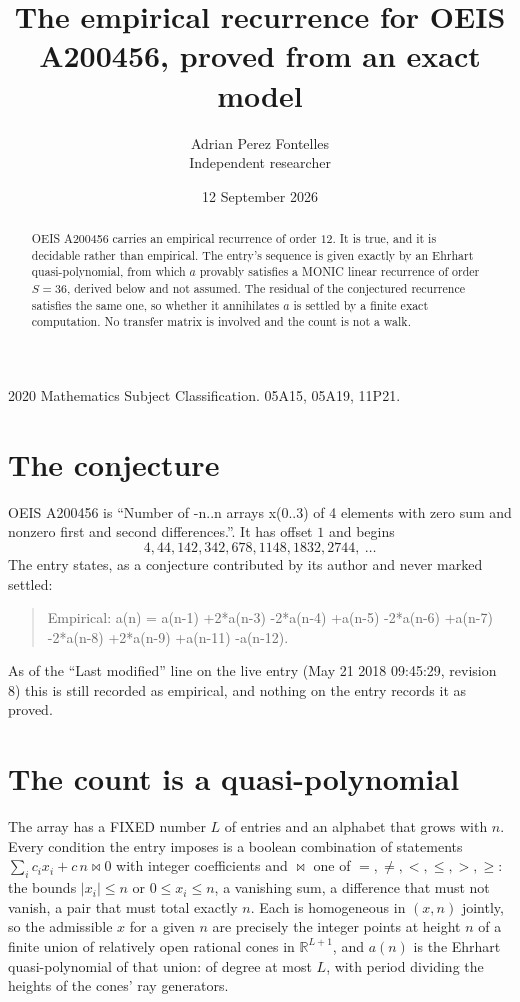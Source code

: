 \documentclass[11pt,a4paper]{article}
\title{The empirical recurrence for OEIS A200456, proved from an exact model}
\author{Adrian Perez Fontelles\\ \small Independent researcher}
\date{12 September 2026}
\theoremstyle{plain}
\theoremstyle{definition}
\begin{document}
\maketitle

\begin{abstract}
OEIS A200456 carries an empirical recurrence of order $12$. It is true, and it is
decidable rather than empirical. The entry's sequence is given exactly by an Ehrhart quasi-polynomial, from
which $a$ provably satisfies a MONIC linear recurrence of order $S=36$, derived below and not
assumed. The residual of the conjectured recurrence satisfies the same one, so whether it
annihilates $a$ is settled by a finite exact computation. No transfer matrix is involved and
the count is not a walk.
\end{abstract}

\noindent\small 2020 Mathematics Subject Classification. 05A15, 05A19, 11P21.\normalsize

\section{The conjecture}

OEIS A200456 is ``Number of -n..n arrays x(0..3) of 4 elements with zero sum and nonzero first and second differences.''. It has offset $1$ and begins
\[
4, 44, 142, 342, 678, 1148, 1832, 2744,\ \dots
\]
The entry states, as a conjecture contributed by its author and never marked settled:
\begin{quote}
Empirical: a(n) = a(n-1) +2*a(n-3) -2*a(n-4) +a(n-5) -2*a(n-6) +a(n-7) -2*a(n-8) +2*a(n-9) +a(n-11) -a(n-12).
\end{quote}
As of the ``Last modified'' line on the live entry (May 21 2018 09:45:29, revision 8)
this is still recorded as empirical, and nothing on the entry records it as proved.

\section{The count is a quasi-polynomial}

The array has a FIXED number $L$ of entries and an alphabet that grows with $n$. Every
condition the entry imposes is a boolean combination of statements
$\sum_i c_ix_i + c\,n \bowtie 0$ with integer coefficients and $\bowtie$ one of
$=,\ne,<,\le,>,\ge$: the bounds $|x_i|\le n$ or $0\le x_i\le n$, a vanishing sum, a difference
that must not vanish, a pair that must total exactly $n$. Each is homogeneous in $(x,n)$
jointly, so the admissible $x$ for a given $n$ are precisely the integer points at height $n$
of a finite union of relatively open rational cones in $\mathbb{R}^{L+1}$, and $a(n)$ is
the Ehrhart quasi-polynomial of that union: of degree at most $L$, with period dividing the
heights of the cones' ray generators.
\end{document}
